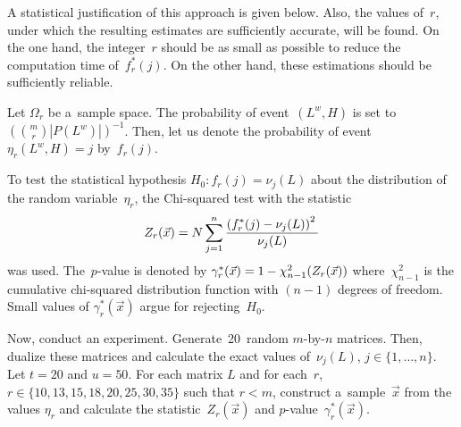 \begin{multicols}{2}
A statistical justification of this approach is given below. 
Also, the values of~$r$, under which the resulting
estimates are sufficiently accurate, will be found.
On the one hand, the integer~$r$ should be as small as possible to
reduce the computation time of~$f^*_r(j)$. On the other hand,
these estimations should be sufficiently reliable.

Let $\Omega_r$ be a~sample space.
The probability of event~$(L^w,H)$ is set to 
$\left(\binom{m}{r} |P(L^w)|\right)^{-1}$.
Then, let us denote the probability of event $\eta_r(L^w,H)=j$ by~$f_r(j)$.

To test the statistical hypothesis $H_0: f_r(j)=\nu_j (L)$ about
the distribution of the random variable~$\eta_r$,  the
Chi-squared test with the statistic
$$
Z_r(\vec{x})= N \sum\limits_{j=1}^{n}
\displaystyle\frac{\displaystyle \left( f^*_r(j)-\nu_j(L)\right)^2\mathstrut}{\displaystyle \nu_j(L)\mathstrut}
$$
was used. The~$p$-value is denoted by $\gamma_r^*(\vec{x})=1\linebreak -\chi_{n-1}^2
(Z_r(\vec{x}))$ where~$\chi_{n-1}^2$ is the cumulative
chi-squared distribution function with $(n-1)$ degrees of freedom.
Small values of $\gamma_r^*(\vec{x})$ argue for rejecting~$H_0$.

Now, conduct an experiment.
Generate~20~random $m$-by-$n$ matrices.
Then, dualize these matrices and calculate the exact values of~$\nu_j(L)$, 
$j \in \{1, \ldots, n\}$.
Let $t=20$ and $u=50$. For each matrix $L$ and for each~$r$, $r
\in \{10,13,15,18,20,25,30,35\}$ such that $r < m$, construct a~sample~$\vec x$ from the values $\eta_r$ and calculate the
statistic~$Z_r(\vec{x})$ and $p$-value~$\gamma_r^*(\vec{x})$.

\begin{table*}\small
\begin{center}
    \label{tab:z_r}
\vspace*{2ex}


\end{center}
\end{table*}
\end{multicols}
